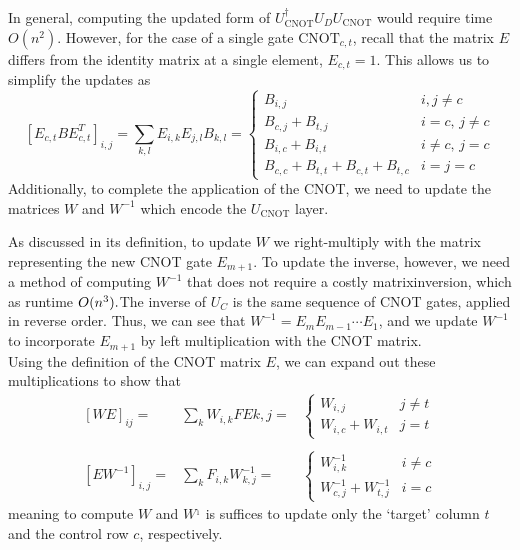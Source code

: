 In general, computing the updated form of $U_{\text{CNOT}}^{\dagger}U_{D}U_{\text{CNOT}}$ would require time $O(n^{2})$. However, for the case of a single gate $\text{CNOT}_{c,t}$, recall that the matrix $E$ differs from the identity matrix at a single element, $E_{c,t}=1$. This allows us to simplify the updates as
\begin{equation}
\label{eq:cnot_phaseupdate}
\left[E_{c,t}BE_{c,t}^{T}\right]_{i,j} = \sum_{k,l}E_{i,k}E_{j,l}B_{k,l} =
\begin{cases}
B_{i,j} & i,j\neq c \\
B_{c,j}+B_{t,j} & i=c,\,j\neq c\\
B_{i,c}+B_{i,t} & i\neq c,\,j=c\\
B_{c,c}+B_{t,t} + B_{c,t} + B_{t,c} & i=j=c
\end{cases}
\end{equation}
Additionally, to complete the application of the CNOT, we need to update the matrices $W$ and $W^{-1}$ which encode the $U_{\text{CNOT}}$ layer.\par
As discussed in its definition, to update $W$ we right-multiply with the matrix representing the new CNOT gate $E_{m+1}$. To update the inverse, however, we need a method of computing $W^{-1}$ that does not require a costly matrixinversion, which as runtime $O(n^{3}). \\
$The inverse of $U_{C}$ is the same sequence of CNOT gates, applied in reverse order. Thus, we can see that $W^{-1}=E_{m}E_{m-1}\cdots E_{1}$, and we update $W^{-1}$ to incorporate $E_{m+1}$ by left multiplication with the CNOT matrix.\\
Using the definition of the CNOT matrix $E$, we can expand out these multiplications to show that
\[
\begin{array}{rcl}
\left[WE\right]_{ij} = &  \sum_{k}W_{i,k}FE{k,j} = & \begin{cases} W_{i,j} & j\neq t \\ W_{i,c}+W_{i,t} & j=t \end{cases}\\
\\
\left[EW^{-1}\right]_{i,j} = &  \sum_{k}F_{i,k}W_{k,j}^{-1} = & \begin{cases} W^{-1}_{i,k} & i\neq c \\ W^{-1}_{c,j}+W^{-1}_{t,j} & i=c \end{cases}
\end{array}\]
meaning to compute $W$ and $W^{_1}$ is suffices to update only the `target' column $t$ and the control row $c$, respectively.\par
